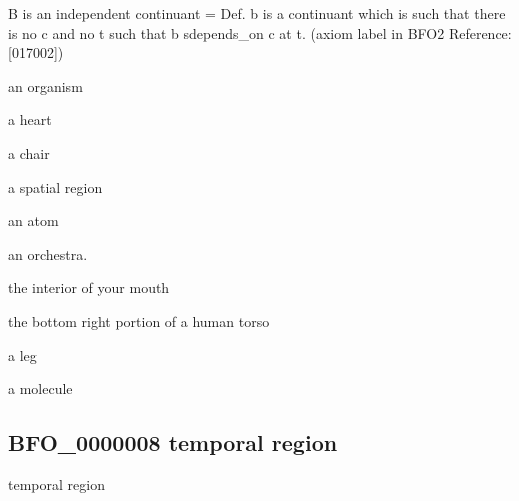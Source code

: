 \documentclass[letterpaper,10pt,english]{sphinxmanual}
\begin{document}
\begin{sphinxShadowBox}

\sphinxAtStartPar
{\hyperref[\detokenize{doc-BFO_0000002::doc}]{}}
\end{sphinxShadowBox}

\begin{sphinxShadowBox}

\sphinxAtStartPar
B is an independent continuant = Def. b is a continuant which is such that there is no c and no t such that b s\sphinxhyphen{}depends\_on c at t. (axiom label in BFO2 Reference: {[}017\sphinxhyphen{}002{]})
\end{sphinxShadowBox}

\begin{sphinxShadowBox}

\sphinxAtStartPar
an organism

\sphinxAtStartPar
a heart

\sphinxAtStartPar
a chair

\sphinxAtStartPar
a spatial region

\sphinxAtStartPar
an atom

\sphinxAtStartPar
an orchestra.

\sphinxAtStartPar
the interior of your mouth

\sphinxAtStartPar
the bottom right portion of a human torso

\sphinxAtStartPar
a leg

\sphinxAtStartPar
a molecule
\end{sphinxShadowBox}

\begin{sphinxShadowBox}

\sphinxAtStartPar
{}
\end{sphinxShadowBox}
\begin{quote}

\ignorespaces \end{quote}


\subsection{BFO\_0000008 \sphinxhyphen{} temporal region}
\label{\detokenize{doc-BFO_0000008:bfo-0000008-temporal-region}}\label{\detokenize{doc-BFO_0000008:index-0}}\label{\detokenize{doc-BFO_0000008::doc}}
\begin{sphinxShadowBox}

\sphinxAtStartPar
temporal region
\end{sphinxShadowBox}
\end{document}

